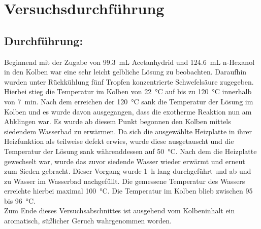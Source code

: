 \section{Versuchsdurchführung}
\label{sec:durchfuerung}


\subsection*{Durchführung:}
Beginnend mit der Zugabe von \SI{99,3}{\milli \liter} Acetanhydrid und \SI{124,6}{\milli \liter} n-Hexanol in den Kolben war eine sehr leicht gelbliche Lösung zu beobachten. Daraufhin wurden unter Rückkühlung fünf Tropfen konzentrierte Schwefelsäure zugegeben. Hierbei stieg die Temperatur im Kolben von \SI{22}{\celsius} auf bis zu \SI{120}{\celsius} innerhalb von \SI{7}{\minute}. Nach dem erreichen der \SI{120}{\celsius} sank die Temperatur der Lösung im Kolben und es wurde davon ausgegangen, dass die exotherme Reaktion nun am Abklingen war. Es wurde ab diesem Punkt begonnen den Kolben mittels siedendem Wasserbad zu erwärmen. Da sich die ausgewählte Heizplatte in ihrer Heizfunktion als teilweise defekt erwies, wurde diese ausgetauscht und die Temperatur der Lösung sank währenddessen auf \SI{50}{\celsius}. Nach dem die Heizplatte gewechselt war, wurde das zuvor siedende Wasser wieder erwärmt und erneut zum Sieden gebracht. Dieser Vorgang wurde \SI{1}{\hour} lang durchgeführt und ab und zu Wasser im Wasserbad nachgefüllt. Die gemessene Temperatur des Wassers erreichte hierbei maximal \SI{100}{\celsius}. Die Temperatur im Kolben blieb zwischen 95 bis \SI{96}{\celsius}.\\ Zum Ende dieses Versuchsabschnittes ist ausgehend vom Kolbeninhalt ein aromatisch, süßlicher Geruch wahrgenommen worden.

